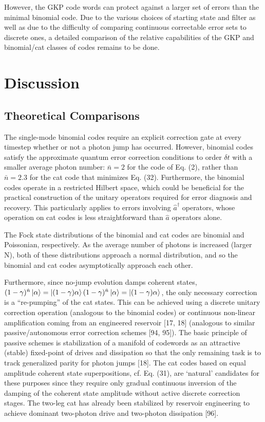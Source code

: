 \documentclass[12]{amsart}
\newcommand\0{\mathbf{0}}
\newcommand\<{\langle}
\renewcommand\>{\rangle}
\begin{document}
However, the GKP code words can protect against a larger set of errors than the minimal binomial code. Due to the various choices of starting state and filter as well as due to the difficulty of comparing continuous correctable error sets to discrete ones, a detailed comparison of the relative capabilities of the GKP and binomial/cat classes of codes remains to be done.

\section{Discussion}

\subsection{Theoretical Comparisons}

The single-mode binomial codes require an explicit correction gate at every timestep whether or not a photon jump has occurred. However, binomial codes satisfy the approximate quantum error correction conditions to order $\delta t$ with a smaller average photon number: $\bar{n} = 2$ for the code of Eq. (2), rather than $\bar{n} = 2.3$ for the cat code that minimizes Eq. (32). Furthermore, the binomial codes operate in a restricted Hilbert space, which could be beneficial for the practical construction of the unitary operators required for error diagnosis and recovery. This particularly applies to errors involving $\hat{a}^\dag$ operators, whose operation on cat codes is less straightforward than $\hat{a}$ operators alone.

The Fock state distributions of the binomial and cat codes are binomial and Poissonian, respectively. As the average number of photons is increased (larger N), both of these distributions approach a normal distribution, and so the binomial and cat codes asymptotically approach each other. 

Furthermore, since no-jump evolution damps coherent states, $(1 - \gamma)^{\hat{n}}\ket{\alpha} = \ket{(1 - \gamma) \alpha}(1 - \gamma)^{\hat{n}}\ket{\alpha} = \ket{(1 - \gamma) \alpha}$, the only necessary correction is a “re-pumping” of the cat states. This can be achieved using a discrete unitary correction operation (analogous to the binomial codes) or continuous non-linear amplification coming from an engineered reservoir [17, 18] (analogous to similar passive/autonomous error correction schemes [94, 95]). The basic principle of passive schemes is stabilization of a manifold of codewords as an attractive (stable) fixed-point of drives and dissipation so that the only remaining task is to track generalized parity for photon jumps [18]. The cat codes based on equal amplitude coherent state superpositions, cf. Eq. (31), are ‘natural’ candidates for these purposes since they require only gradual continuous inversion of the damping of the coherent state amplitude without active discrete correction stages. The two-leg cat has already been stabilized by reservoir engineering to achieve dominant two-photon drive and two-photon dissipation [96].
\end{document}
